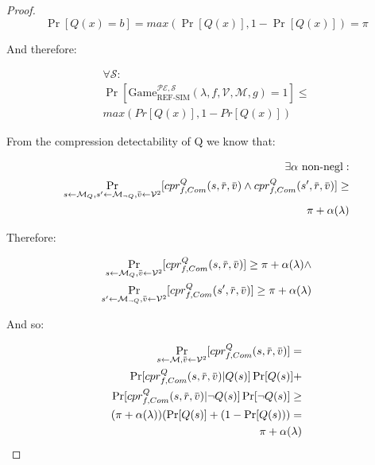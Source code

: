 \documentclass{sig-alternate-05-2015}
\newcommand{\overbar}[1]{\mkern 1.5mu\overline{\mkern-1.5mu#1\mkern-1.5mu}\mkern 1.5mu}
\begin{document}
\begin{proof}
\begin{equation*}
    \Pr[Q(x) = b] = max(\Pr[Q(x)], 1 - \Pr[Q(x)]) = \pi
\end{equation*}

And therefore:

\begin{align*}
    \forall \mathcal{S}:\\
    \Pr[
        \text{Game}_{\text{REF-SIM}}^{\mathcal{PE},\mathcal{S}}
        (\lambda, f, \mathcal{V}, \mathcal{M}, g) = 1
    ]
    \leq\\
    max(Pr[Q(x)], 1 - Pr[Q(x)])
\end{align*}

From the compression detectability of Q we know that:

\begin{align*}
    \exists \alpha \text{ non-negl}:\\
    \Pr_{s \leftarrow \mathcal{M}_Q,
         s' \leftarrow \mathcal{M}_{\lnot Q},
         \overbar{v} \leftarrow \mathcal{V}^2}
         [cpr^Q_{f, Com}(s, \overbar{r}, \overbar{v}) \land
          cpr^Q_{f, Com}(s', \overbar{r}, \overbar{v})]
    \geq\\
    \pi + \alpha(\lambda)
\end{align*}

Therefore:

\begin{align*}
    \Pr_{s \leftarrow \mathcal{M}_Q,
         \overbar{v} \leftarrow \mathcal{V}^2}
         [cpr^Q_{f, Com}(s, \overbar{r}, \overbar{v})]
    \geq
    \pi + \alpha(\lambda) \land\\
    \Pr_{s' \leftarrow \mathcal{M}_{\lnot Q},
         \overbar{v} \leftarrow \mathcal{V}^2}
         [cpr^Q_{f, Com}(s', \overbar{r}, \overbar{v})]
    \geq
    \pi + \alpha(\lambda)
\end{align*}

And so:

\begin{align*}
    \Pr_{s \leftarrow \mathcal{M},
         \overbar{v} \leftarrow \mathcal{V}^2}
         [cpr^Q_{f, Com}(s, \overbar{r}, \overbar{v})]
    =\\
    \Pr[cpr^Q_{f, Com}(s, \overbar{r}, \overbar{v})|Q(s)]\Pr[Q(s)]
    +\\
    \Pr[cpr^Q_{f, Com}(s, \overbar{r}, \overbar{v})|\lnot Q(s)]\Pr[\lnot Q(s)]
    \geq\\
    (\pi + \alpha(\lambda))(\Pr[Q(s)] + (1 - \Pr[Q(s)))
    =\\
    \pi + \alpha(\lambda)
\end{align*}


\end{proof}
\end{document}
